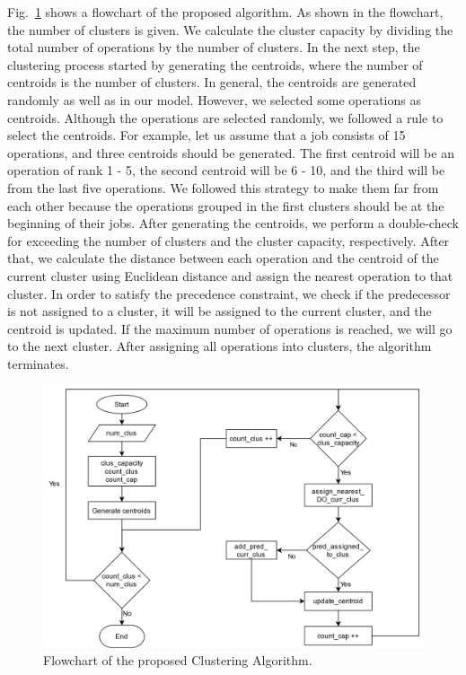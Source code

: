 \documentclass[runningheads]{llncs}
\begin{document}
Fig.~\ref{fig1} shows a flowchart of the proposed algorithm. As shown in the flowchart, the number of clusters is given. We calculate the cluster capacity by dividing the total number of operations by the number of clusters. In the next step, the clustering process started by generating the centroids, where the number of centroids is the number of clusters. In general, the centroids are generated randomly as well as in our model. However, we selected some operations as centroids. Although the operations are selected randomly, we followed a rule to select the centroids. For example, let us assume that a job consists of 15 operations, and three centroids should be generated. The first centroid will be an operation of rank 1 - 5, the second centroid will be 6 - 10, and the third will be from the last five operations. We followed this strategy to make them far from each other because the operations grouped in the first clusters should be at the beginning of their jobs. After generating the centroids, we perform a double-check for exceeding the number of clusters and the cluster capacity, respectively. After that, we calculate the distance between each operation and the centroid of the current cluster using Euclidean distance and assign the nearest operation to that cluster. In order to satisfy the precedence constraint, we check if the predecessor is not assigned to a cluster, it will be assigned to the current cluster, and the centroid is updated. If the maximum number of operations is reached, we will go to the next cluster. After assigning all operations into clusters, the algorithm terminates.

\begin{figure}[h!]
  \includegraphics[width=\linewidth]{Flow_chart_9.png}
  \caption{Flowchart of the proposed Clustering Algorithm.}
  \label{fig1}
\end{figure}
\end{document}
